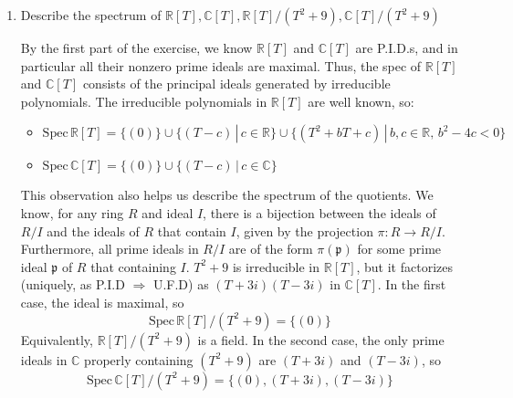 \begin{problem}
\begin{enumerate}[label=(\theproblem.\arabic*),ref=\theproblem.\arabic*]
        \item Describe the spectrum of $\mathbb{R}[T], \mathbb{C}[T], \mathbb{R}[T]/(T^2+9), \mathbb{C}[T]/(T^2+9)$
            \begin{sol}
                    By the first part of the exercise, we know $\mathbb{R}[T]$ and $\mathbb{C}[T]$ are P.I.D.s,
                    and in particular all their nonzero prime ideals are maximal.
                    Thus, the spec of $\mathbb{R}[T]$ and $\mathbb{C}[T]$ consists
                    of the principal ideals generated by irreducible polynomials.
                    The irreducible polynomials in $\mathbb{R}[T]$ are well known, so:
                    \begin{itemize}
                        \item $\text{Spec}\,\mathbb{R}[T] = \{ (0)\} \cup \{ (T-c) \, | \, c \in \mathbb{R} \}
                        \cup \{(T^2 + bT + c) \, | \, b, c \in \mathbb{R}, \, b^2-4c < 0\}$
                        \item $\text{Spec}\,\mathbb{C}[T] = \{ (0)\} \cup \{ (T-c) \, | \, c \in \mathbb{C} \}$
                    \end{itemize}
                    This observation also helps us describe the spectrum of the quotients.
                    We know, for any ring $R$ and ideal $I$,
                    there is a bijection between the ideals of $R/I$ and the ideals of $R$ that contain $I$,
                    given by the projection $\pi: R \rightarrow R/I$.
                    Furthermore, all prime ideals in $R/I$ are of the form $\pi(\mathfrak{p})$ for some prime ideal $\mathfrak{p}$
                    of $R$ that containing $I$. $T^2 + 9$ is irreducible in $\mathbb{R}[T]$,
                    but it factorizes (uniquely, as P.I.D $\Rightarrow$ U.F.D) as $(T+3i)(T-3i)$ in $\mathbb{C}[T]$.
                    In the first case, the ideal is maximal, so
                    \[
                        \text{Spec}\,\mathbb{R}[T]/(T^2+9) = \{ (0)\}
                    \]
                    Equivalently, $\mathbb{R}[T]/(T^2+9)$ is a field.
                    In the second case, the only prime ideals in $\mathbb{C}$ properly containing
                    $(T^2+9)$ are $(T + 3i)$ and $(T - 3i)$, so
                    \[
                        \text{Spec}\,\mathbb{C}[T]/(T^2+9) = \{ (0), (T + 3i), (T - 3i) \}
                    \]

            \end{sol}
    \end{enumerate}
\end{problem}